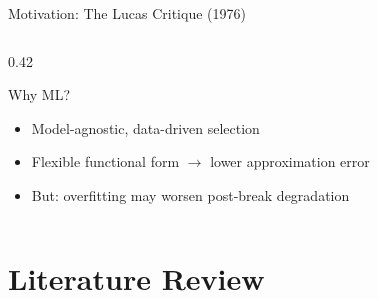\documentclass[aspectratio=169, 10pt]{beamer}
\begin{document}
\begin{frame}{Motivation: The Lucas Critique (1976)}
\begin{columns}[T]
\begin{column}{0.42\textwidth}
      \vspace{6pt}
      \begin{block}{Why ML?}
        \begin{itemize}\setlength\itemsep{2pt}
          \item Model-agnostic, data-driven selection
          \item Flexible functional form $\to$ lower approximation error
          \item But: overfitting may worsen post-break degradation
        \end{itemize}
      \end{block}
    \end{column}
  \end{columns}

\end{frame}

\section{Literature Review}
\end{document}
